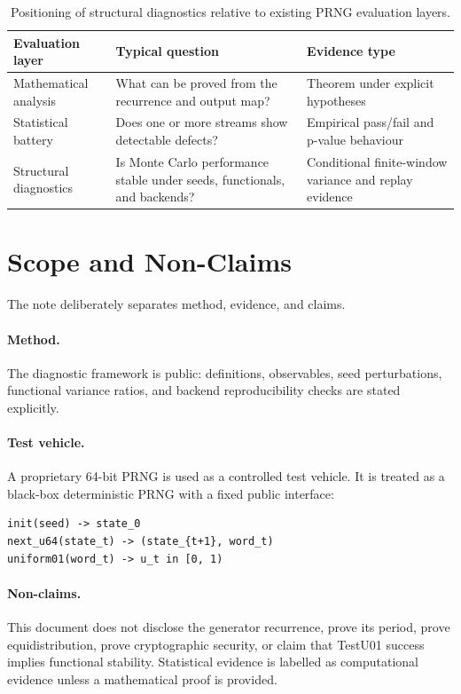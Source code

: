 \documentclass[11pt,a4paper]{article}
\begin{document}
\begin{table}[ht]
\centering
\small
\begin{tabular}{p{}p{}p{}}
\toprule
Evaluation layer & Typical question & Evidence type \\
\midrule
Mathematical analysis & What can be proved from the recurrence and output map? & Theorem under explicit hypotheses \\
Statistical battery & Does one or more streams show detectable defects? & Empirical pass/fail and p-value behaviour \\
Structural diagnostics & Is Monte Carlo performance stable under seeds, functionals, and backends? & Conditional finite-window variance and replay evidence \\
\bottomrule
\end{tabular}
\caption{Positioning of structural diagnostics relative to existing PRNG evaluation layers.}
\label{tab:evaluation_layers}
\end{table}

\section{Scope and Non-Claims}

The note deliberately separates method, evidence, and claims.

\paragraph{Method.} The diagnostic framework is public: definitions, observables, seed perturbations, functional variance ratios, and backend reproducibility checks are stated explicitly.

\paragraph{Test vehicle.} A proprietary 64-bit PRNG is used as a controlled test vehicle. It is treated as a black-box deterministic PRNG with a fixed public interface:

\begin{lstlisting}
init(seed) -> state_0
next_u64(state_t) -> (state_{t+1}, word_t)
uniform01(word_t) -> u_t in [0, 1)
\end{lstlisting}

\paragraph{Non-claims.} This document does not disclose the generator recurrence, prove its period, prove equidistribution, prove cryptographic security, or claim that TestU01 success implies functional stability. Statistical evidence is labelled as computational evidence unless a mathematical proof is provided.
\end{document}
